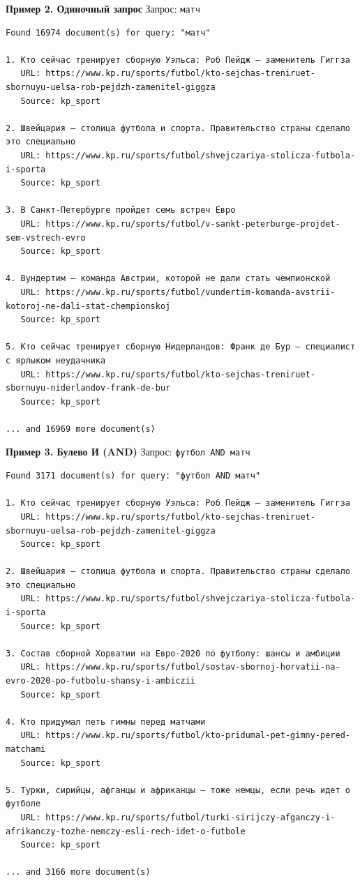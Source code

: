 \textbf{Пример 2. Одиночный запрос}
Запрос: \texttt{матч}
\begin{verbatim}
Found 16974 document(s) for query: "матч"

1. Кто сейчас тренирует сборную Уэльса: Роб Пейдж — заменитель Гиггза
   URL: https://www.kp.ru/sports/futbol/kto-sejchas-treniruet-sbornuyu-uelsa-rob-pejdzh-zamenitel-giggza
   Source: kp_sport

2. Швейцария – столица футбола и спорта. Правительство страны сделало это специально
   URL: https://www.kp.ru/sports/futbol/shvejczariya-stolicza-futbola-i-sporta
   Source: kp_sport

3. В Санкт-Петербурге пройдет семь встреч Евро
   URL: https://www.kp.ru/sports/futbol/v-sankt-peterburge-projdet-sem-vstrech-evro
   Source: kp_sport

4. Вундертим – команда Австрии, которой не дали стать чемпионской
   URL: https://www.kp.ru/sports/futbol/vundertim-komanda-avstrii-kotoroj-ne-dali-stat-chempionskoj
   Source: kp_sport

5. Кто сейчас тренирует сборную Нидерландов: Франк де Бур – специалист с ярлыком неудачника
   URL: https://www.kp.ru/sports/futbol/kto-sejchas-treniruet-sbornuyu-niderlandov-frank-de-bur
   Source: kp_sport

... and 16969 more document(s)
\end{verbatim}

\textbf{Пример 3. Булево И (AND)}
Запрос: \texttt{футбол AND матч}
\begin{verbatim}
Found 3171 document(s) for query: "футбол AND матч"

1. Кто сейчас тренирует сборную Уэльса: Роб Пейдж — заменитель Гиггза
   URL: https://www.kp.ru/sports/futbol/kto-sejchas-treniruet-sbornuyu-uelsa-rob-pejdzh-zamenitel-giggza
   Source: kp_sport

2. Швейцария – столица футбола и спорта. Правительство страны сделало это специально
   URL: https://www.kp.ru/sports/futbol/shvejczariya-stolicza-futbola-i-sporta
   Source: kp_sport

3. Состав сборной Хорватии на Евро-2020 по футболу: шансы и амбиции
   URL: https://www.kp.ru/sports/futbol/sostav-sbornoj-horvatii-na-evro-2020-po-futbolu-shansy-i-ambiczii
   Source: kp_sport

4. Кто придумал петь гимны перед матчами
   URL: https://www.kp.ru/sports/futbol/kto-pridumal-pet-gimny-pered-matchami
   Source: kp_sport

5. Турки, сирийцы, афганцы и африканцы – тоже немцы, если речь идет о футболе
   URL: https://www.kp.ru/sports/futbol/turki-sirijczy-afganczy-i-afrikanczy-tozhe-nemczy-esli-rech-idet-o-futbole
   Source: kp_sport

... and 3166 more document(s)
\end{verbatim}


